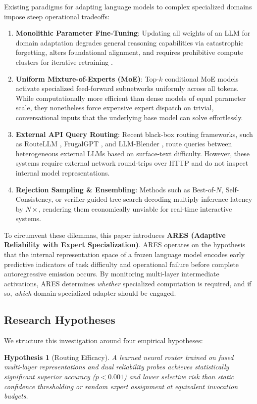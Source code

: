 \documentclass[journal,10pt,twocolumn]{IEEEtran}
\newtheorem{hypothesis}{Hypothesis}
\begin{document}
Existing paradigms for adapting language models to complex specialized domains impose steep operational tradeoffs:
\begin{enumerate}
    \item \textbf{Monolithic Parameter Fine-Tuning}: Updating all weights of an LLM for domain adaptation degrades general reasoning capabilities via catastrophic forgetting, alters foundational alignment, and requires prohibitive compute clusters for iterative retraining \cite{hu2022lora, dou2023loramoe}.
    \item \textbf{Uniform Mixture-of-Experts (MoE)}: Top-$k$ conditional MoE models \cite{shazeer2017moe, fedus2022switch, jiang2024mixtral} activate specialized feed-forward subnetworks uniformly across all tokens. While computationally more efficient than dense models of equal parameter scale, they nonetheless force expensive expert dispatch on trivial, conversational inputs that the underlying base model can solve effortlessly.
    \item \textbf{External API Query Routing}: Recent black-box routing frameworks, such as RouteLLM \cite{ong2024routellm}, FrugalGPT \cite{chen2023frugalgpt}, and LLM-Blender \cite{jiang2023llmblender}, route queries between heterogeneous external LLMs based on surface-text difficulty. However, these systems require external network round-trips over HTTP and do not inspect internal model representations.
    \item \textbf{Rejection Sampling \& Ensembling}: Methods such as Best-of-$N$, Self-Consistency, or verifier-guided tree-search decoding multiply inference latency by $N \times$, rendering them economically unviable for real-time interactive systems.
\end{enumerate}

To circumvent these dilemmas, this paper introduces \textbf{ARES (Adaptive Reliability with Expert Specialization)}. ARES operates on the hypothesis that the internal representation space of a frozen language model encodes early predictive indicators of task difficulty and operational failure before complete autoregressive emission occurs. By monitoring multi-layer intermediate activations, ARES determines \textit{whether} specialized computation is required, and if so, \textit{which} domain-specialized adapter should be engaged.

\subsection{Research Hypotheses}
We structure this investigation around four empirical hypotheses:
\begin{hypothesis}[Routing Efficacy]
A learned neural router trained on fused multi-layer representations and dual reliability probes achieves statistically significant superior accuracy ($p < 0.001$) and lower selective risk than static confidence thresholding or random expert assignment at equivalent invocation budgets.
\end{hypothesis}
\end{document}
